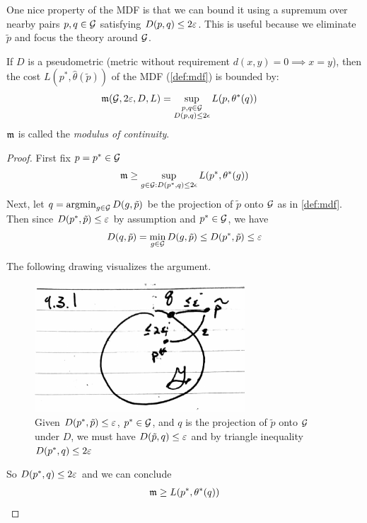One nice property of the MDF is that we can bound it using a supremum over
nearby pairs $p,q \in \mathcal{G}$ satisfying $D(p,q) \leq 2 \varepsilon$. This is useful
because we eliminate $\tilde{p}$ and focus the theory around $\mathcal{G}$.
\begin{proposition}\label{prop:mdf-modulus-error-bound}
    If $D$ is a pseudometric (metric without requirement $d(x,y) = 0 \implies x = y$),
    then the cost $L(p^*, \hat\theta(\tilde{p}))$ of the MDF (\cref{def:mdf}) is bounded by:
    \begin{align}
        \mathfrak{m}(\mathcal{G}, 2\varepsilon, D, L) &= \sup_{\substack{p, q \in \mathcal{G} \\ D(p,q) \leq 2 \epsilon}} L(p, \theta^*(q))
    \end{align}
    $\mathfrak{m}$ is called the \emph{modulus of continuity}.
\end{proposition}

\begin{proof}
    First fix $p = p^* \in \mathcal{G}$
    \begin{align}
        \mathfrak{m} \geq \sup_{g \in \mathcal{G} : D(p^*, q) \leq 2 \epsilon} L(p^*, \theta^*(g))
    \end{align}
    Next, let $q = \operatorname{argmin}_{g \in \mathcal{G}} D(g, \tilde{p})$ be the projection of $\tilde{p}$ onto $\mathcal{G}$
    as in \cref{def:mdf}.
    Then since $D(p^*, \tilde{p}) \leq \varepsilon$ by assumption and $p^* \in \mathcal{G}$, we have
    \begin{align}
        D(q, \tilde{p}) = \min_{g \in \mathcal{G}} D(g, \tilde{p}) \leq D(p^*, \tilde{p}) \leq \varepsilon
    \end{align}
    
    The following drawing visualizes the argument.
    \begin{figure}[H]
        \centering
        \includegraphics[width=0.7\textwidth]{figures/9-3-1.png}
        \caption{Given $D(p^*, \tilde{p}) \leq \varepsilon$, $p^* \in \mathcal{G}$, and
            $q$ is the projection of $\tilde{p}$ onto $\mathcal{G}$ under $D$, we must
            have $D(\tilde{p}, q) \leq \varepsilon$ and by triangle inequality
            $D(p^*, q) \leq 2\varepsilon$
        }
    \end{figure}
    
    So $D(p^*, q) \leq 2 \varepsilon$ and we can conclude
    \begin{align}
        \mathfrak{m} \geq L(p^*, \theta^*(q))
    \end{align}
\end{proof}

